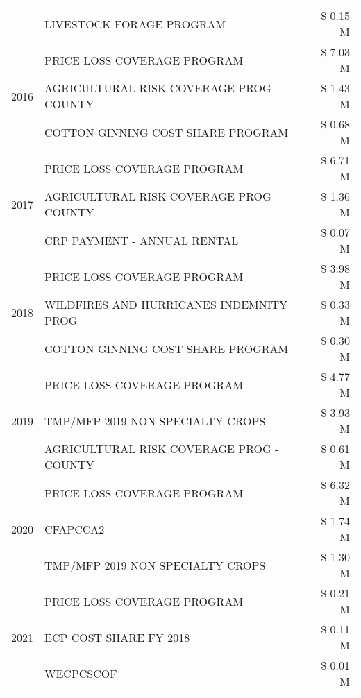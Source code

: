 \begin{tabular}{llr}
 & LIVESTOCK FORAGE PROGRAM & \$ 0.15 M \\
\cline{1-3}
\multirow[t]{3}{*}{2016} & PRICE LOSS COVERAGE PROGRAM                   & \$ 7.03 M \\
 & AGRICULTURAL RISK COVERAGE PROG - COUNTY      & \$ 1.43 M \\
 & COTTON GINNING COST SHARE PROGRAM             & \$ 0.68 M \\
\cline{1-3}
\multirow[t]{3}{*}{2017} & PRICE LOSS COVERAGE PROGRAM & \$ 6.71 M \\
 & AGRICULTURAL RISK COVERAGE PROG - COUNTY & \$ 1.36 M \\
 & CRP PAYMENT - ANNUAL RENTAL & \$ 0.07 M \\
\cline{1-3}
\multirow[t]{3}{*}{2018} & PRICE LOSS COVERAGE PROGRAM & \$ 3.98 M \\
 & WILDFIRES AND HURRICANES INDEMNITY PROG & \$ 0.33 M \\
 & COTTON GINNING COST SHARE PROGRAM & \$ 0.30 M \\
\cline{1-3}
\multirow[t]{3}{*}{2019} & PRICE LOSS COVERAGE PROGRAM & \$ 4.77 M \\
 & TMP/MFP 2019 NON SPECIALTY CROPS & \$ 3.93 M \\
 & AGRICULTURAL RISK COVERAGE PROG - COUNTY & \$ 0.61 M \\
\cline{1-3}
\multirow[t]{3}{*}{2020} & PRICE LOSS COVERAGE PROGRAM & \$ 6.32 M \\
 & CFAPCCA2 & \$ 1.74 M \\
 & TMP/MFP 2019 NON SPECIALTY CROPS & \$ 1.30 M \\
\cline{1-3}
\multirow[t]{3}{*}{2021} & PRICE LOSS COVERAGE PROGRAM & \$ 0.21 M \\
 & ECP COST SHARE FY 2018 & \$ 0.11 M \\
 & WECPCSCOF & \$ 0.01 M \\
\cline{1-3}
\bottomrule
\end{tabular}
